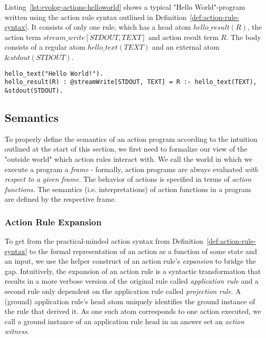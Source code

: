 \begin{example}
Listing~\ref{lst:evolog-actions-helloworld} shows a typical "Hello World"-program written using the action rule syntax outlined in Definition~\ref{def:action-rule-syntax}. It consists of only one rule, which has a head atom $hello\_result(R)$, the action term $stream\_write[STDOUT, TEXT]$ and action result term $R$. The body consists of a regular atom $hello\_text(TEXT)$ and an external atom $\&stdout(STDOUT)$.
\begin{lstlisting}[style=asp-code, label={lst:evolog-actions-helloworld}, caption={A "Hello World"-program in Evolog.}]
hello_text("Hello World!").
hello_result(R) : @streamWrite[STDOUT, TEXT] = R :- hello_text(TEXT), &stdout(STDOUT).	
\end{lstlisting}
\end{example}	

\subsection{Semantics}
\label{subsec:evolog-actions-semantics}

To properly define the semantics of an action program according to the intuition outlined at the start of this section, we first need to formalize our view of the "outside world" which action rules interact with. We call the world in which we execute a program a \emph{frame} - formally, action programs are always evaluated \emph{with respect to a given frame}. The behavior of actions is specified in terms of \emph{action functions}. The semantics (i.e. interpretations) of action functions in a program are defined by the respective frame.

\subsubsection{Action Rule Expansion}
\label{subsubsec:evolog-actions-semantics-expansion}

To get from the practical-minded action syntax from Definition~\ref{def:action-rule-syntax} to the formal representation of an action as a function of some state and an input, we use the helper construct of an action rule's \emph{expansion} to bridge the gap. Intuitively, the expansion of an action rule is a syntactic transformation that results in a more verbose version of the original rule called \emph{application rule} and a second rule only dependent on the application rule called \emph{projection rule}. A (ground) application rule's head atom uniquely identifies the ground instance of the rule that derived it. As one such atom corresponds to one action executed, we call a ground instance of an application rule head in an answer set an \emph{action witness}. 

